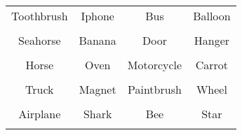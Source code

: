 \documentclass[12pt,a4paper]{article}
\begin{document}
\thispagestyle{empty}
\begin{table}[]
\centering
\Huge
\begin{tabular}{cccc}
 Toothbrush& Iphone& Bus& Balloon\\  & & & \\
 Seahorse& Banana& Door& Hanger\\  & & & \\
 Horse& Oven& Motorcycle& Carrot\\  & & & \\
 Truck& Magnet& Paintbrush& Wheel\\  & & & \\
 Airplane& Shark& Bee& Star\\  & & & \\
\end{tabular}
\end{table}
\end{document}
